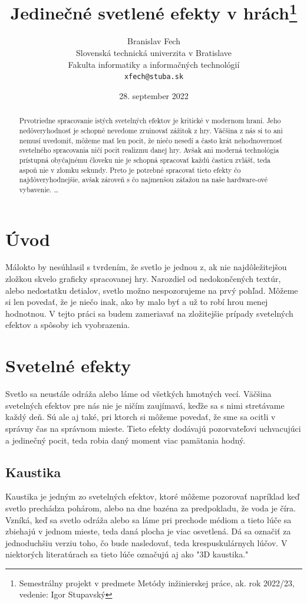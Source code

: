 \documentclass[10pt,twoside,slovak,a4paper]{article}
\title{Jedinečné svetlené efekty v hrách\thanks{Semestrálny projekt v predmete Metódy inžinierskej práce, ak. rok 2022/23, vedenie: Igor Stupavský}} %
\author{Branislav Fech\\[2pt]
	{\small Slovenská technická univerzita v Bratislave}\\
	{\small Fakulta informatiky a informačných technológií}\\
	{\small \texttt{xfech@stuba.sk}}
	}
\date{\small 28. september 2022} %
\begin{document}
\maketitle

\begin{abstract}
Prvotriedne spracovanie istých svetelných efektov je kritické v modernom hraní. 
Jeho nedôveryhodnosť je schopné nevedome zruinovať zážitok z hry. Väčšina z nás 
si to ani nemusí uvedomiť, môžeme mať len pocit, že niečo nesedí a často krát 
nehodnovernosť svetelného spracovania ničí pocit realizmu danej hry. Avšak ani 
moderná technológia prístupná obyčajnému človeku nie je schopná spracovať každú 
časticu zvlášť, teda aspoň nie v zlomku sekundy. Preto je potrebné spracovať tieto 
efekty čo najdôveryhodnejšie, avšak zároveň s čo najmenšou záťažou na naše hardware-ové 
vybavenie.
\ldots
\end{abstract}



\section{Úvod}
Málokto by nesúhlasil s tvrdením, že svetlo je jednou z, ak nie najdôležitejšou zložkou 
skvelo graficky spracovanej hry. Narozdiel od nedokončených textúr, alebo nedostatku 
detialov, svetlo možno nespozorujeme na prvý pohľad. Môžeme si len povedať, že je niečo 
inak, ako by malo byť a už to robí hrou menej hodnotnou. V tejto práci sa budem zameriavať 
na zložitejšie prípady svetelných efektov a spôsoby ich vyobrazenia.

\section{Svetelné efekty} \label{se}
Svetlo sa neustále odráža alebo láme od všetkých hmotných vecí. Väčšina svetelných efektov 
pre nás nie je ničím zaujímavá, keďže sa s nimi stretávame každý deň. Sú ale aj také, pri 
ktorch si môžeme povedať, že sme sa ocitli v správny čas na správnom mieste. Tieto efekty 
dodávajú  pozorvateľovi uchvacujúci a jedinečný pocit, teda robia daný moment viac pamätania 
hodný.

\subsection{Kaustika} \label{se:kaustika}
Kaustika je jedným zo svetelných efektov, ktoré môžeme pozorovať napríklad keď svetlo 
prechádza pohárom, alebo na dne bazéna za predpokladu, že voda je číra. Vzníká, keď sa 
svetlo odráža alebo sa láme pri prechode médiom a tieto lúče sa zbiehajú v jednom mieste, 
teda daná plocha je viac osvetlená. Dá sa označiť za jednoduchšiu verziu toho, čo bude 
nasledovať, teda krespuskulárnych lúčov. V niektorých literatúrach sa tieto lúče označujú 
aj ako "3D kaustika."
\end{document}
